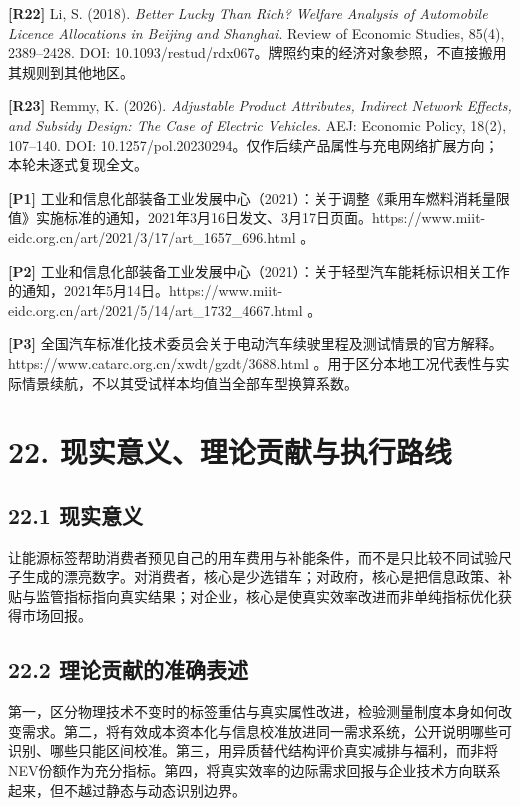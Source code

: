 \documentclass[
  11pt,
]{article}
\begin{document}
\textbf{{[}R22{]}} Li, S. (2018). \emph{Better Lucky Than Rich? Welfare
Analysis of Automobile Licence Allocations in Beijing and Shanghai}.
Review of Economic Studies, 85(4), 2389--2428. DOI:
10.1093/restud/rdx067。牌照约束的经济对象参照，不直接搬用其规则到其他地区。

\textbf{{[}R23{]}} Remmy, K. (2026). \emph{Adjustable Product
Attributes, Indirect Network Effects, and Subsidy Design: The Case of
Electric Vehicles}. AEJ: Economic Policy, 18(2), 107--140. DOI:
10.1257/pol.20230294。仅作后续产品属性与充电网络扩展方向；本轮未逐式复现全文。

\textbf{{[}P1{]}}
工业和信息化部装备工业发展中心（2021）：关于调整《乘用车燃料消耗量限值》实施标准的通知，2021年3月16日发文、3月17日页面。https://www.miit-eidc.org.cn/art/2021/3/17/art\_1657\_696.html
。

\textbf{{[}P2{]}}
工业和信息化部装备工业发展中心（2021）：关于轻型汽车能耗标识相关工作的通知，2021年5月14日。https://www.miit-eidc.org.cn/art/2021/5/14/art\_1732\_4667.html
。

\textbf{{[}P3{]}}
全国汽车标准化技术委员会关于电动汽车续驶里程及测试情景的官方解释。https://www.catarc.org.cn/xwdt/gzdt/3688.html
。用于区分本地工况代表性与实际情景续航，不以其受试样本均值当全部车型换算系数。

\section{22.
现实意义、理论贡献与执行路线}\label{ux73b0ux5b9eux610fux4e49ux7406ux8bbaux8d21ux732eux4e0eux6267ux884cux8defux7ebf}

\subsection{22.1 现实意义}\label{ux73b0ux5b9eux610fux4e49}

让能源标签帮助消费者预见自己的用车费用与补能条件，而不是只比较不同试验尺子生成的漂亮数字。对消费者，核心是少选错车；对政府，核心是把信息政策、补贴与监管指标指向真实结果；对企业，核心是使真实效率改进而非单纯指标优化获得市场回报。

\subsection{22.2
理论贡献的准确表述}\label{ux7406ux8bbaux8d21ux732eux7684ux51c6ux786eux8868ux8ff0}

第一，区分物理技术不变时的标签重估与真实属性改进，检验测量制度本身如何改变需求。第二，将有效成本资本化与信息校准放进同一需求系统，公开说明哪些可识别、哪些只能区间校准。第三，用异质替代结构评价真实减排与福利，而非将NEV份额作为充分指标。第四，将真实效率的边际需求回报与企业技术方向联系起来，但不越过静态与动态识别边界。
\end{document}
